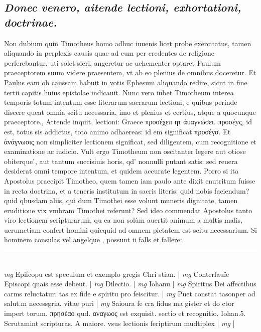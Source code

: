 \documentclass{article}
\begin{document}
\begin{pages}
\subsection*{\textit{Donec venero, aitende lectioni, exhortationi, doctrinae. }}\pstart Non dubium quin Timotheus homo adhuc iuuenis licet probe exercitatus, tamen aliquando in perplexis causis quae ad eum per credentes de religione perferebantur, uti solet sieri, angeretur ac uehementer optaret Paulum praeceptorem suum videre praesentem, vt ab eo plenius de omnibus doceretur. Et Paulus eam ob caussam habuit in votis Ephesum aliquando redire, sicut in fine tertii capitis huius epistolae indicauit. Nunc vero iubet Timotheum interea temporis totum intentum esse literarum sacrarum lectioni, e quibus perinde discere queat omnia scitu necessaria, imo et plenius et certius, atque a quocunque praeceptore., Attende inquit, lectioni: Graece προσέχεπ ητ ἀυαγνώσει. προσέyς, id est, totus sis addictus, toto animo adhaereas: id em significat προσέγσ. Et ἀνάγνωσις non simpliciter lectionem significat, sed diligentem, cum recognitione et examinatione ac iudicio. Vult ergo Timotheum non oscitanter legere aut otiose obiterque ́, aut tantum succisiuis horis, qd' nonnulli putant satis: sed reuera desiderat omni tempore intentum, et quidem accurate legentem. Porro si ita Apostolus praecipit Timotheo, quem tamen iam paulo ante dixit enutritum fuisse in recta doctrina, et a teneris institutum in sacris literis: quid nobis faciendum? quid qbusdam aliis, qui dum Timothei esse volunt muneris dignitate, tamen eruditione vix vmbram Timothei referunt? Sed ideo commendat Apostolus tanto viro lectionem scripturarum, qu ea non solùm auertit animum a multis malis, uerumetiam confert homini quicquid ad omnem pietatem est scitu necessarium. Si hominem consulas vel angelque , possunt ii falls et fallere:  \pend
\vspace{0.5cm}\noindent
\vspace{0.2cm}\rule{1cm}{0.2pt}\\ 
\hspace{0.2cm}\textit{mg}
\footnotesize Epifcopu est speculum et exemplo gregis Chri stian. 
\normalsize| 
\hspace{0.2cm}\textit{mg}
\footnotesize Conterfauïe Episcopi quais esse debeut. 
\normalsize| 
\hspace{0.2cm}\textit{mg}
\footnotesize Dilectio. 
\normalsize| 
\hspace{0.2cm}\textit{mg}
\footnotesize Iohanu 
\normalsize| 
\hspace{0.2cm}\textit{mg}
\footnotesize Spiritus Dei affectibus carms reluctatur. tas ex fide e spiritu pro feiscitur. 
\normalsize| 
\hspace{0.2cm}\textit{mg}
\footnotesize Puet constat tasonper ad salut.m necessgria. vitae puri
\normalsize| 
\hspace{0.2cm}\textit{mg}
\footnotesize Saioura fe cra fidus ma gister et do ctor impert torum. πρησέαο qud. αναγωος est exquisit. sectio et recognitio. Iohan.5. Scrutamint scripturas. A maiore. vsus lectionis feriptirum mudtiplex
\normalsize| 
\hspace{0.2cm}\textit{mg}
\footnotesize 
\normalsize| 

\end{pages}
\end{document}
